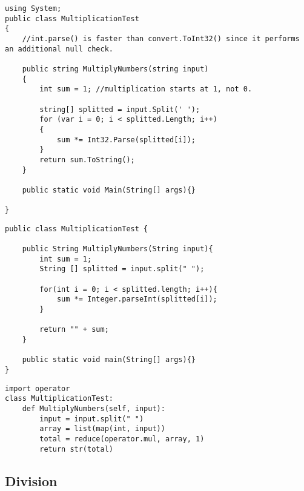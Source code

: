 	\lstset{style=sharpc}
	\begin{lstlisting}
using System;
public class MultiplicationTest
{
    //int.parse() is faster than convert.ToInt32() since it performs an additional null check.

    public string MultiplyNumbers(string input)
    {
        int sum = 1; //multiplication starts at 1, not 0.

        string[] splitted = input.Split(' ');
        for (var i = 0; i < splitted.Length; i++)
        {
            sum *= Int32.Parse(splitted[i]);
        }
        return sum.ToString();
    }

	public static void Main(String[] args){}

}
	\end{lstlisting}

	\lstset{style=java}
	\begin{lstlisting}
public class MultiplicationTest {

	public String MultiplyNumbers(String input){
		int sum = 1;
		String [] splitted = input.split(" ");

		for(int i = 0; i < splitted.length; i++){
			sum *= Integer.parseInt(splitted[i]);
		}

		return "" + sum;
	}

	public static void main(String[] args){}
}
	\end{lstlisting}


	\lstset{style=python}
	\begin{lstlisting}
import operator
class MultiplicationTest:
    def MultiplyNumbers(self, input):
        input = input.split(" ")
        array = list(map(int, input))
        total = reduce(operator.mul, array, 1)
        return str(total)
	\end{lstlisting}


\subsection{Division}


